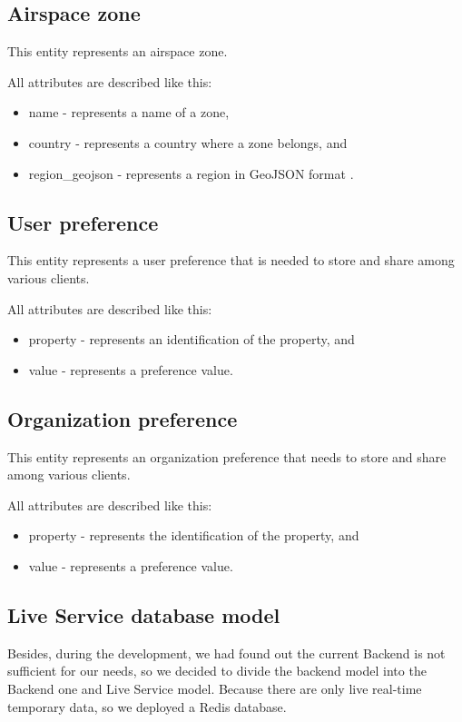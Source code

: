 \subsection{Airspace zone}\label{subsec:airspace-zone}
This entity represents an airspace zone.

All attributes are described like this:
\begin{itemize}
    \item name - represents a name of a zone,
    \item country - represents a country where a zone belongs, and
    \item region\_geojson - represents a region in GeoJSON format \cite{geoJson}.
\end{itemize}

\subsection{User preference}\label{subsec:user-preference}
This entity represents a user preference that is needed to store and share among various clients.

All attributes are described like this:
\begin{itemize}
    \item property - represents an identification of the property, and
    \item value - represents a preference value.
\end{itemize}

\subsection{Organization preference}\label{subsec:organization-preference}
This entity represents an organization preference that needs to store and share among various clients.

All attributes are described like this:
\begin{itemize}
    \item property - represents the identification of the property, and
    \item value - represents a preference value.
\end{itemize}

\subsection{Live Service database model}\label{subsec:live-service-database-model}
Besides, during the development, we had found out the current Backend is not sufficient for our needs, so we decided to divide the backend model into the Backend one and Live Service model.
Because there are only live real-time temporary data, so we deployed a Redis database.

